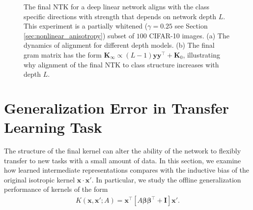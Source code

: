\documentclass{article} %
\def\x{\bm x}
\begin{document}
\begin{appendix}
\begin{figure}[t]
    \centering
    \caption{The final NTK for a deep linear network aligns with the class specific directions with strength that depends on network depth $L$. This experiment is a partially whitened ($\gamma=0.25$ see Section \ref{sec:nonlinear_anisotropy}) subset of $100$ CIFAR-10 images. (a) The dynamics of alignment for different depth models. (b) The final gram matrix has the form $\bm K_{\infty} \propto (L-1) \bm y \bm y^\top + \bm K_0$, illustrating why alignment of the final NTK to class structure increases with depth $L$. }
    \label{fig:align_vs_depth}
\end{figure}



\section{Generalization Error in Transfer Learning Task}\label{app:transfer_theory}

The structure of the final kernel can alter the ability of the network to flexibly transfer to new tasks with a small amount of data. In this section, we examine how learned intermediate representations compares with the inductive bias of the original isotropic kernel $\x \cdot \x'$.  In particular, we study the offline generalization performance of kernels of the form
\begin{align}
    K(\x,\x'; A) = \x^\top \left[ A \bm\beta \bm\beta^\top + \bm I \right] \x'.
\end{align}


\end{appendix}
\end{document}
